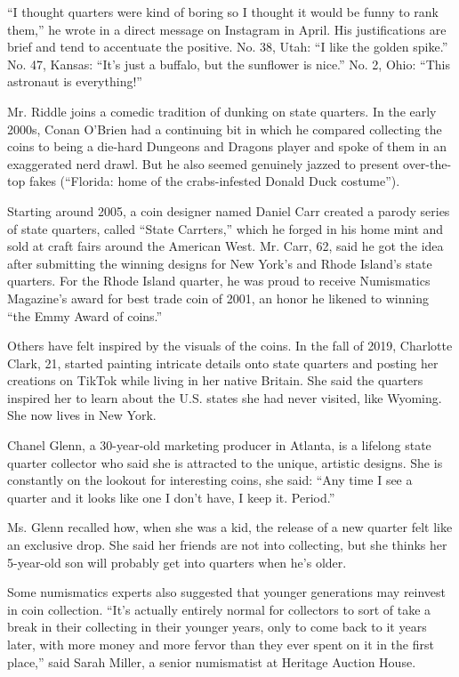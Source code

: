 ``I thought quarters were kind of boring so I thought it would be funny
to rank them,'' he wrote in a direct message on Instagram in April. His
justifications are brief and tend to accentuate the positive. No. 38,
Utah: ``I like the golden spike.'' No. 47, Kansas: ``It's just a
buffalo, but the sunflower is nice.'' No. 2, Ohio: ``This astronaut is
everything!''

Mr. Riddle joins a comedic tradition of dunking on state quarters. In
the early 2000s, Conan O'Brien had a continuing bit in which he compared
collecting the coins to being a die-hard Dungeons and Dragons player and
spoke of them in an exaggerated nerd drawl. But he also seemed genuinely
jazzed to present over-the-top fakes (``Florida: home of the
crabs-infested Donald Duck costume'').

Starting around 2005, a coin designer named Daniel Carr created a parody
series of state quarters, called ``State Carrters,'' which he forged in
his home mint and sold at craft fairs around the American West. Mr.
Carr, 62, said he got the idea after submitting the winning designs for
New York's and Rhode Island's state quarters. For the Rhode Island
quarter, he was proud to receive Numismatics Magazine's award for best
trade coin of 2001, an honor he likened to winning ``the Emmy Award of
coins.''

Others have felt inspired by the visuals of the coins. In the fall of
2019, Charlotte Clark, 21, started painting intricate details onto state
quarters and posting her creations on TikTok while living in her native
Britain. She said the quarters inspired her to learn about the U.S.
states she had never visited, like Wyoming. She now lives in New York.

Chanel Glenn, a 30-year-old marketing producer in Atlanta, is a lifelong
state quarter collector who said she is attracted to the unique,
artistic designs. She is constantly on the lookout for interesting
coins, she said: ``Any time I see a quarter and it looks like one I
don't have, I keep it. Period.''

Ms. Glenn recalled how, when she was a kid, the release of a new quarter
felt like an exclusive drop. She said her friends are not into
collecting, but she thinks her 5-year-old son will probably get into
quarters when he's older.

Some numismatics experts also suggested that younger generations may
reinvest in coin collection. ``It's actually entirely normal for
collectors to sort of take a break in their collecting in their younger
years, only to come back to it years later, with more money and more
fervor than they ever spent on it in the first place,'' said Sarah
Miller, a senior numismatist at Heritage Auction House.

